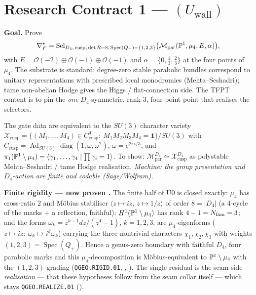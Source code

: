 \section*{Research Contract 1 --- $(U_{\mathrm{wall}})$}
\noindent\textbf{Goal.} Prove
\[
  \nabla_F^\star=\operatorname{Sel}_{D_4,\,\mathrm{cusp},\,\det R=8,\,\operatorname{Spec}(Q_+)=\{1,2,3\}}
  \bigl(\mathcal M_{\mathrm{par}}(\mathbb P^1,\mu_4,E,\alpha)\bigr),
\]
with $E=\mathcal O(-2)\oplus\mathcal O(-1)\oplus\mathcal O(-1)$ and $\alpha=\{0,\tfrac13,\tfrac23\}$ at the
four points of $\mu_4$. The substrate is standard: degree-zero stable parabolic bundles correspond to
unitary representations with prescribed local monodromies (Mehta--Seshadri); tame non-abelian Hodge gives
the Higgs / flat-connection side. The TFPT content is to pin the \emph{one} $D_4$-symmetric, rank-3,
four-point point that realises the selectors.

\begin{lemma}[U0 --- normalisation]
The gate data are equivalent to the $SU(3)$ character variety
$\mathcal X_{\mathrm{cusp}}=\{(M_1,\dots,M_4)\in C_{\mathrm{cusp}}^4:\ M_1M_2M_3M_4=\mathbf1\}/SU(3)$ with
$C_{\mathrm{cusp}}=\operatorname{Ad}_{SU(3)}\operatorname{diag}(1,\omega,\omega^2)$, $\omega=e^{2\pi i/3}$,
and $\pi_1(\mathbb P^1\setminus\mu_4)=\langle\gamma_1,\dots,\gamma_4\mid\prod\gamma_i=1\rangle$. To show:
$\mathcal M_{\mathrm{par}}^{D_4}\simeq\mathcal X_{\mathrm{cusp}}^{D_4}$ as polystable Mehta--Seshadri / tame
Hodge realisation. \emph{Machine: the group presentation and $D_4$-action are finite and codable
(Sage/Wolfram).}
\end{lemma}

\noindent\textbf{Finite rigidity --- now proven \mE.} The finite half of U0 is closed exactly:
$\mu_4$ has cross-ratio $2$ and M\"obius stabiliser $\langle z\mapsto iz,\,z\mapsto1/z\rangle$ of
order $8=|D_4|$ (a $4$-cycle of the marks $+$ a reflection, faithful); $H^1(\mathbb P^1\setminus\mu_4)$ has
rank $4-1=N_{\mathrm{fam}}=3$; and the forms $\omega_k=z^{k-1}dz/(z^4-1)$, $k=1,2,3$, are $\mu_4$-eigenforms
($z\mapsto iz:\ \omega_k\mapsto i^k\omega_k$) carrying the three nontrivial characters
$\chi_1,\chi_2,\chi_3$ with weights $(1,2,3)=\operatorname{Spec}(Q_+)$. Hence a genus-zero boundary
with faithful $D_4$, four parabolic marks and this $\mu_4$-decomposition is M\"obius-equivalent to
$\mathbb P^1\setminus\mu_4$ with the $(1,2,3)$ grading (\texttt{QGEO.RIGID.01}, \mE,
). The single residual is the seam-side \emph{realisation} --- that
these hypotheses follow from the seam collar itself --- which stays \texttt{QGEO.REALIZE.01} (\mC).

